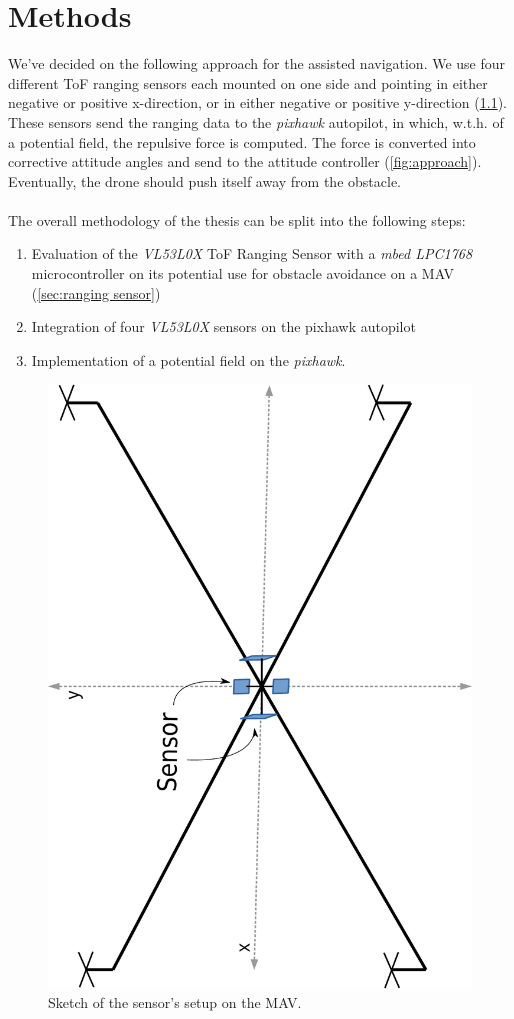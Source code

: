 \chapter{Methods}
\label{ch:methods}
We've decided on the following approach for the assisted navigation. We use four different ToF ranging sensors each mounted on one side and pointing in either negative or positive x-direction, or in either negative or positive y-direction (\cref{fig:sketch}). These sensors send the ranging data to the \textit{pixhawk} autopilot, in which, w.t.h. of a potential field, the repulsive force is computed. The force is converted into corrective attitude angles and send to the attitude controller (\cref{fig:approach}). Eventually, the drone should push itself away from the obstacle.\\\\

The overall methodology of the thesis can be split into the following steps:
\begin{enumerate}
	\item Evaluation of the \textit{VL53L0X} ToF Ranging Sensor with a \textit{mbed LPC1768} microcontroller on its potential use for obstacle avoidance on a MAV (\cref{sec:ranging sensor})
	\item Integration of four \textit{VL53L0X} sensors on the pixhawk autopilot
	\item Implementation of a potential field on the \textit{pixhawk}.
\end{enumerate}

\begin{figure}
	\centering
	\includegraphics[width=0.4\linewidth, angle = 270]{pictures/mav_sketch.pdf}
	\caption{Sketch of the sensor's setup on the MAV.}
	\label{fig:sketch}
\end{figure}

